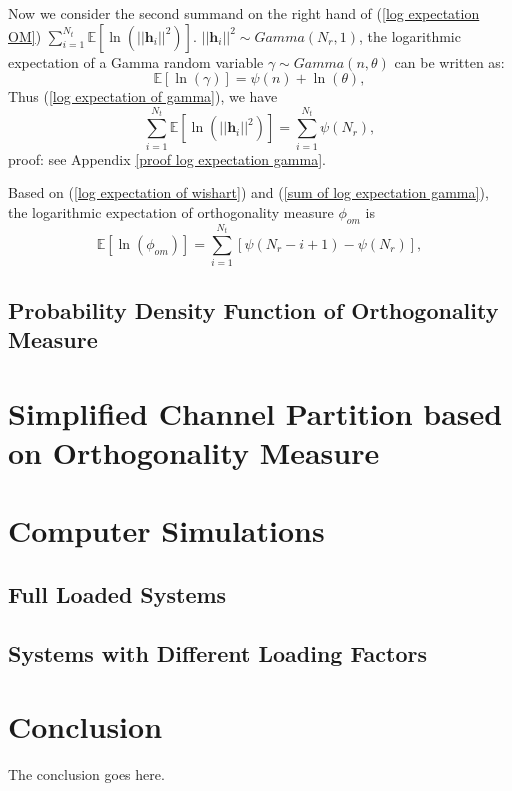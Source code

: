 \documentclass[12pt, draftclsnofoot, onecolumn]{IEEEtran}
\begin{document}
Now we consider the second summand on the right hand of (\ref{log expectation OM}) $\sum_{i=1}^{N_{t}}\mathbb{E}[\ln(||\mathbf{h}_{i}||^{2})]$. $||\mathbf{h}_{i}||^{2}\sim Gamma(N_{r}, 1)$, the logarithmic expectation of a Gamma random variable $\gamma\sim Gamma(n, \theta)$ can be written as:
\begin{equation}
\mathbb{E}[\ln(\gamma)]=\psi(n)+\ln(\theta),
\label{log expectation of gamma}
\end{equation}
Thus (\ref{log expectation of gamma}), we have
\begin{equation}
\sum_{i=1}^{N_{t}}\mathbb{E}[\ln(||\mathbf{h}_{i}||^{2})]=\sum_{i=1}^{N_{t}}\psi(N_{r}),
\label{sum of log expectation gamma}
\end{equation}
proof: see Appendix \ref{proof log expectation gamma}.

Based on (\ref{log expectation of wishart}) and (\ref{sum of log expectation gamma}), the logarithmic expectation of orthogonality measure $\phi_{om}$ is 
\begin{equation}
\mathbb{E}[\ln(\phi_{om})]=\sum_{i=1}^{N_{t}}[\psi(N_{r}-i+1)-\psi(N_{r})],
\label{final log expectation OM}
\end{equation}
\subsection{Probability Density Function of Orthogonality Measure}
\section{Simplified Channel Partition based on Orthogonality Measure}
\section{Computer Simulations}
\subsection{Full Loaded Systems}
\subsection{Systems with Different Loading Factors}

\section{Conclusion}
The conclusion goes here.
\end{document}
